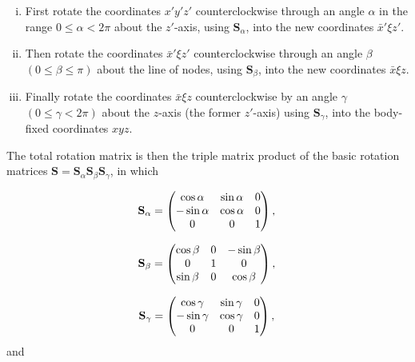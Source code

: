 \begin{enumerate}[(i)]  
	\item First rotate the coordinates $x'y'z'$ counterclockwise through an angle $\alpha$ in the range $0 \leq \alpha < 2\pi$ about the $z'$-axis, using $\mathbf{S}_{\alpha}$, into the new coordinates $\bar{x}'\xi z'$.
	\item Then rotate the coordinates $\bar{x}' \xi z'$ counterclockwise through an angle $\beta$ $(0 \leq \beta \leq \pi)$ about the line of nodes, using $\mathbf{S}_{\beta}$, into the new coordinates $\bar{x} \xi z$.
	\item Finally rotate the coordinates $\bar{x} \xi z$ counterclockwise by an angle $\gamma$ $(0 \leq \gamma < 2\pi)$ about the $z$-axis (the former $z'$-axis) using $\mathbf{S}_{\gamma}$, into the body-fixed coordinates $xyz$.
\end{enumerate}   
The total rotation matrix is then the triple matrix product of the basic rotation matrices $\mathbf{S} = \mathbf{S}_{\alpha}\mathbf{S}_{\beta}\mathbf{S}_{\gamma}$, in which

\begin{equation}
\mathbf{S}_{\alpha}=
\begin{pmatrix}
\cos\alpha & \sin\alpha  & 0\\
-\sin\alpha & \cos\alpha & 0\\
0            & 0            & 1
\end{pmatrix},\\
\end{equation}

\begin{equation}
\mathbf{S}_{\beta}=
\begin{pmatrix}
\cos\beta & 0  & -\sin\beta\\
0 & 1 & 0\\
\sin\beta & 0  & \cos\beta
\end{pmatrix},\\
\end{equation}

\begin{equation}
\mathbf{S}_{\gamma}=
\begin{pmatrix}
\cos\gamma & \sin\gamma  & 0\\
-\sin\gamma & \cos\gamma & 0\\
0            & 0            & 1
\end{pmatrix},\\
\end{equation}
and

